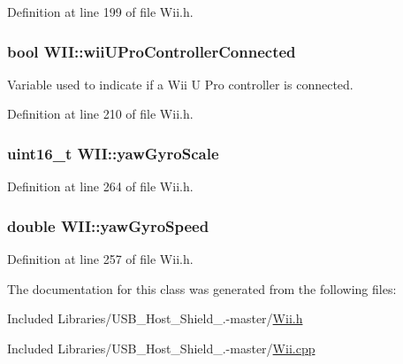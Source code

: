 \-Definition at line 199 of file \-Wii.\-h.

\hypertarget{class_w_i_i_a461f5b7a5f2bc874e107fc776c284b16}{
\subsubsection[{wii\-U\-Pro\-Controller\-Connected}]{\setlength{\rightskip}{0pt plus 5cm}bool {\bf \-W\-I\-I\-::wii\-U\-Pro\-Controller\-Connected}}}\label{class_w_i_i_a461f5b7a5f2bc874e107fc776c284b16}
\-Variable used to indicate if a \-Wii \-U \-Pro controller is connected. 

\-Definition at line 210 of file \-Wii.\-h.

\hypertarget{class_w_i_i_a0694969a30092b9b1dcb26120c7cff73}{
\subsubsection[{yaw\-Gyro\-Scale}]{\setlength{\rightskip}{0pt plus 5cm}uint16\-\_\-t {\bf \-W\-I\-I\-::yaw\-Gyro\-Scale}}}\label{class_w_i_i_a0694969a30092b9b1dcb26120c7cff73}


\-Definition at line 264 of file \-Wii.\-h.

\hypertarget{class_w_i_i_ad5df436cc5d073f26bf3ea5c60d788d6}{
\subsubsection[{yaw\-Gyro\-Speed}]{\setlength{\rightskip}{0pt plus 5cm}double {\bf \-W\-I\-I\-::yaw\-Gyro\-Speed}}}\label{class_w_i_i_ad5df436cc5d073f26bf3ea5c60d788d6}


\-Definition at line 257 of file \-Wii.\-h.



\-The documentation for this class was generated from the following files\-:\begin{DoxyCompactItemize}
\item 
\-Included Libraries/\-U\-S\-B\-\_\-\-Host\-\_\-\-Shield\-\_.-\/master/\hyperlink{_wii_8h}{\-Wii.\-h}\item 
\-Included Libraries/\-U\-S\-B\-\_\-\-Host\-\_\-\-Shield\-\_.-\/master/\hyperlink{_wii_8cpp}{\-Wii.\-cpp}\end{DoxyCompactItemize}
